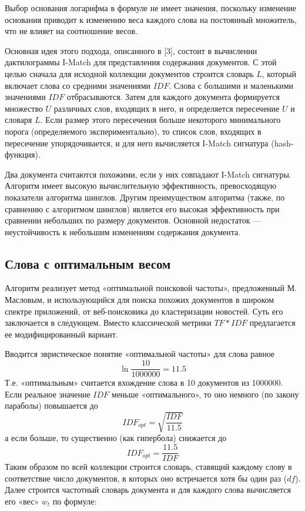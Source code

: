 \documentclass[a4paper,12pt,oneside]{article}
\begin{document}
Выбор основания логарифма в формуле не имеет значения, поскольку изменение основания приводит к изменению веса каждого слова на постоянный множитель, что не влияет на соотношение весов.

Основная идея этого подхода, описанного в [3], состоит в вычислении дактилограммы I-Match для представления содержания документов. С этой целью сначала для исходной коллекции документов строится словарь $L$, который включает слова со средними значениями $IDF$. Слова с большими и маленькими значениями $IDF$ отбрасываются. Затем для каждого документа формируется множество $U$ различных слов, входящих в него, и определяется пересечение $U$ и словаря $L$. Если размер этого пересечения больше некоторого минимального порога (определяемого экспериментально), то список слов, входящих в пересечение упорядочивается, и для него вычисляется I-Match сигнатура (hash-функция).

Два документа считаются похожими, если у них совпадают I-Match сигнатуры. Алгоритм имеет высокую вычислительную эффективность, превосходящую показатели алгоритма шинглов. Другим преимуществом алгоритма (также, по сравнению с алгоритмом шинглов) является его высокая эффективность при сравнении небольших по размеру документов. Основной недостаток — неустойчивость к небольшим изменениям содержания документа.

\subsection{Слова с оптимальным весом}
Алгоритм реализует метод «оптимальной поисковой частоты», предложенный М. Масловым, и использующийся для поиска похожих документов в широком спектре приложений, от веб-поисковика до кластеризации новостей. Суть его заключается в следующем. Вместо классической метрики $TF*IDF$ предлагается ее модифицированный вариант. 

Вводится эвристическое понятие «оптимальной частоты» для слова равное \begin{equation} \ln \frac{10}{1000000} = 11.5 \end{equation} Т.е. «оптимальным» считается вхождение слова в 10 документов из
1000000. Если реальное значение $IDF$ меньше «оптимального», то оно немного (по закону параболы) повышается до
\begin{equation} IDF_{opt} = \sqrt{\frac{IDF}{11.5}} \end{equation}
а если больше, то существенно (как гипербола) снижается до
\begin{equation} IDF_{opt} = \frac{11.5}{IDF} \end{equation}
Таким образом по всей коллекции строится словарь, ставящий каждому слову в соответствие число документов, в которых оно встречается хотя бы один раз ($df$).
Далее строится частотный словарь документа и для каждого слова вычисляется его «вес» $ w_t $ по формуле:
\end{document}
